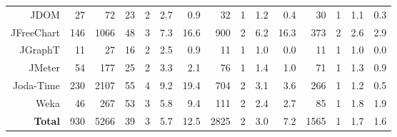 {\begin{tabular}{r@{\quad}
         r
         r
         r
         |rrr|
         r
         |rrr|
         r
         |rrr
      }
         JDOM & 27 & 72 & 23 & 2 & 2.7 & 0.9 & 32 & 1 & 1.2 & 0.4 & 30 & 1 & 1.1 & 0.3 \\
         JFreeChart & 146 & 1066 & 48 & 3 & 7.3 & 16.6 & 900 & 2 & 6.2 & 16.3 & 373 & 2 & 2.6 & 2.9 \\
         JGraphT & 11 & 27 & 16 & 2 & 2.5 & 0.9 & 11 & 1 & 1.0 & 0.0 & 11 & 1 & 1.0 & 0.0 \\
         JMeter & 54 & 177 & 25 & 2 & 3.3 & 2.1 & 76 & 1 & 1.4 & 1.0 & 71 & 1 & 1.3 & 0.9 \\[0.5em]
         Joda-Time & 230 & 2107 & 55 & 4 & 9.2 & 19.4 & 704 & 2 & 3.1 & 3.6 & 266 & 1 & 1.2 & 0.5 \\
         Weka & 46 & 267 & 53 & 3 & 5.8 & 9.4 & 111 & 2 & 2.4 & 2.7 & 85 & 1 & 1.8 & 1.9 \\[0.7em]
         {\bf Total} & 930 & 5266 & 39 & 3 & 5.7 & 12.5 & 2825 & 2 & 3.0 & 7.2 & 1565 & 1 & 1.7 & 1.6 \\
         
      \end{tabular}

      \thesis{\end{adjustwidth}}
      \paper{\end{adjustwidth}}
      
   }
\notslides{\end{table*}}
